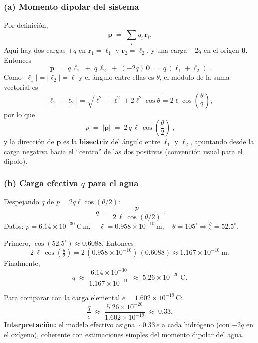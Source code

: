 \documentclass{article}
\begin{document}
\subsubsection*{(a) Momento dipolar del sistema}
Por definición,
\[
\mathbf p \;=\; \sum_i q_i\,\mathbf r_i.
\]
Aquí hay dos cargas $+q$ en $\mathbf r_1=\boldsymbol{\ell}_1$ y $\mathbf r_2=\boldsymbol{\ell}_2$, y una carga $-2q$ en el origen $\mathbf 0$. Entonces
\[
\boxed{\ \mathbf p \;=\; q\,\boldsymbol{\ell}_1 \;+\; q\,\boldsymbol{\ell}_2 \;+\; (-2q)\,\mathbf 0
\;=\; q\,(\boldsymbol{\ell}_1+\boldsymbol{\ell}_2)\ }.
\]
Como $\lvert \boldsymbol{\ell}_1\rvert=\lvert \boldsymbol{\ell}_2\rvert=\ell$ y el ángulo entre ellas es $\theta$, el módulo de la suma vectorial es
\[
\big\lvert \boldsymbol{\ell}_1+\boldsymbol{\ell}_2 \big\rvert
= \sqrt{\ell^2+\ell^2+2\ell^2\cos\theta}
= 2\ell\cos\!\left(\frac{\theta}{2}\right),
\]
por lo que
\[
\boxed{\ p \;=\; \lvert \mathbf p\rvert \;=\; 2\,q\,\ell\,\cos\!\left(\frac{\theta}{2}\right) \ },
\]
y la dirección de $\mathbf p$ es la \textbf{bisectriz} del ángulo entre $\boldsymbol{\ell}_1$ y $\boldsymbol{\ell}_2$, apuntando desde la carga negativa hacia el “centro” de las dos positivas (convención usual para el dipolo).

\subsubsection*{(b) Carga efectiva $q$ para el agua}
Despejando $q$ de $p=2q\ell\cos(\theta/2)$:
\[
\boxed{\ q \;=\; \frac{p}{2\,\ell\,\cos(\theta/2)} \ }.
\]
Datos: $\displaystyle p=6.14\times10^{-30}\ \mathrm{C\,m},\quad
\ell=0.958\times10^{-10}\ \mathrm{m},\quad
\theta=105^\circ\Rightarrow \frac{\theta}{2}=52.5^\circ$.

Primero, $\cos(52.5^\circ)\approx 0.6088$. Entonces
\[
2\,\ell\,\cos\!\left(\tfrac{\theta}{2}\right)
= 2\,(0.958\times10^{-10})\,(0.6088)
\approx 1.167\times10^{-10}\ \mathrm{m}.
\]
Finalmente,
\[
\boxed{\ q\;\approx\; \frac{6.14\times10^{-30}}{1.167\times10^{-10}}
\;\approx\; 5.26\times10^{-20}\ \mathrm{C}. \ }
\]

Para comparar con la carga elemental $e=1.602\times10^{-19}\,\mathrm{C}$:
\[
\frac{q}{e}\;\approx\;\frac{5.26\times10^{-20}}{1.602\times10^{-19}}
\;\approx\; 0.33.
\]
\textbf{Interpretación:} el modelo efectivo asigna $\sim 0.33\,e$ a cada hidrógeno (con $-2q$ en el oxígeno), coherente con estimaciones simples del momento dipolar del agua.
\end{document}
